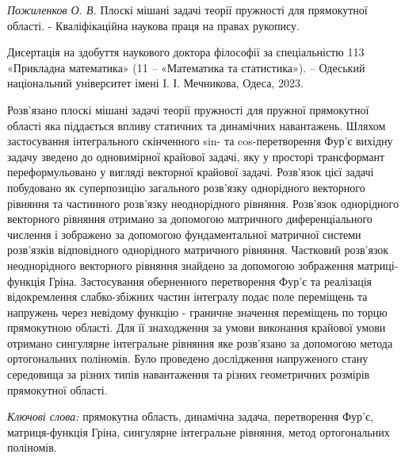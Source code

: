 \textit{Пожиленков О. В.}
Плоскі мішані задачі теорії пружності для прямокутної області. - Кваліфікаційна наукова праця на правах рукопису.

Дисертація на здобуття наукового доктора філософії за спеціальністю 113 «Прикладна математика» (11 – «Математика та статистика»). – Одеський національний університет імені І. І. Мечникова, Одеса, 2023.

Розв'язано плоскі мішані задачі теорії пружності для пружної прямокутної області яка піддається впливу статичних та динамічних навантажень.
Шляхом застосування інтегрального скінченного sin- та cos-перетворення Фур'є вихідну задачу зведено до одновимірної крайової задачі,
яку у просторі трансформант переформульовано у вигляді векторної крайової задачі.
Розв'язок цієї задачі побудовано як суперпозицію загального розв'язку однорідного векторного рівняння та частинного розв'язку неоднорідного рівняння.
Розв'язок однорідного векторного рівняння отримано за допомогою матричного диференціального числення і зображено за допомогою фундаментальної матричної системи розв'язків відповідного однорідного матричного рівняння.
Частковий розв'язок неоднорідного векторного рівняння знайдено за допомогою зображення матриці-функція Гріна.
Застосування оберненного перетворення Фур'є та реалізація відокремлення слабко-збіжних частин інтегралу подає поле переміщень та напружень через невідому функцію - граничне значення переміщень по торцю прямокутною області.
Для її знаходження за умови виконання крайової умови отримано сингулярне інтегральне рівняння яке розв'язано за допомогою метода ортогональних поліномів.
Було проведено дослідження напруженого стану середовища за різних типів навантаження та різних геометричних розмірів прямокутної області.

\textit{Ключові слова:}
прямокутна область, динамічна задача, перетворення Фур’є, матриця-функція Гріна, сингулярне інтегральне рівняння, метод ортогональних поліномів.

